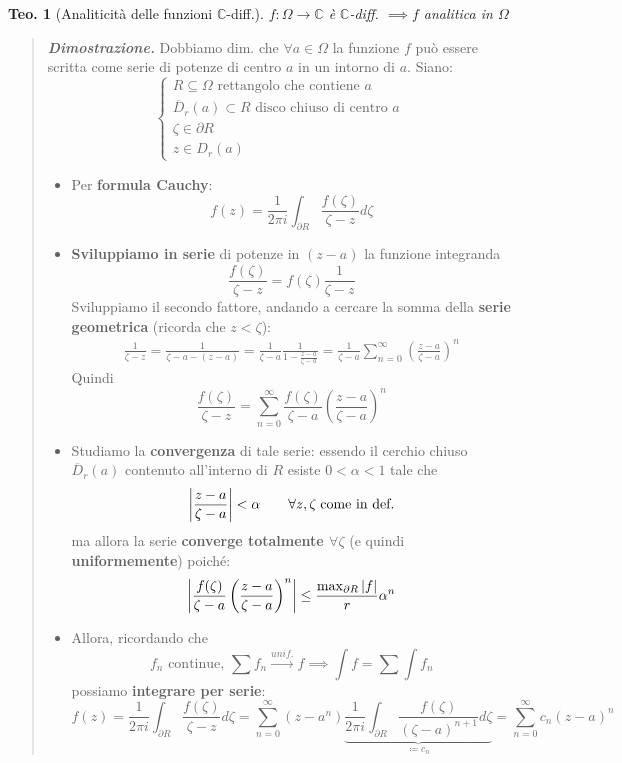 \documentclass[a4paper,10pt]{article}
\newcommand{\im}{\mathbb{C}} %
\theoremstyle{indentdefinition}
\theoremstyle{indenttheorem}
\newtheorem{thm}{Teo.}
\theoremstyle{myremark}
\theoremstyle{indentgeneral}
\newenvironment{dimo}{\begin{quote}\textit{\textbf{Dimostrazione.}}}{\end{quote}} %
\begin{document}
\begin{thm}[Analiticità delle funzioni $\im$-diff.] 
    $f:\Omega\to\im$ è $\im$-diff. $\implies f$ analitica in $\Omega$
\end{thm}

\begin{dimo}
    Dobbiamo dim. che $\forall a\in\Omega$ la funzione $f$ può essere scritta come serie di potenze di centro $a$ in un intorno di $a$. Siano:
    $$
    \begin{cases}
        R\subseteq\Omega \text{ rettangolo che contiene $a$} \\
        \overline{D}_r(a)\subset R \text{ disco chiuso di centro $a$} \\
        \zeta \in \partial R \\
        z\in D_r(a) 
    \end{cases}
    $$
    \begin{itemize}
        \item Per \textbf{formula Cauchy}:
        $$f(z)=\frac{1}{2\pi i}\int_{\partial R}\frac{f(\zeta)}{\zeta-z}d\zeta$$
        \item \textbf{Sviluppiamo in serie} di potenze in $(z-a)$ la funzione integranda 
        $$\frac{f(\zeta)}{\zeta-z}=f(\zeta)\frac{1}{\zeta-z}$$
        Sviluppiamo il secondo fattore, andando a cercare la somma della \textbf{serie geometrica} (ricorda che $z<\zeta$):
        \begin{align*}
            \frac{1}{\zeta-z}=\frac{1}{\zeta-a-(z-a)}=\frac{1}{\zeta-a}\frac{1}{1-\frac{z-a}{\zeta-a}}=\frac{1}{\zeta-a}\sum_{n=0}^\infty\left(\frac{z-a}{\zeta-a}\right)^n
        \end{align*}
        Quindi
        $$\frac{f(\zeta)}{\zeta-z}=\sum_{n=0}^\infty\frac{f(\zeta)}{\zeta-a}\left(\frac{z-a}{\zeta-a}\right)^n$$
       
        \item Studiamo la \textbf{convergenza}  di tale serie: essendo il cerchio chiuso $ \overline{D}_r(a)$ contenuto all'interno di $R$ esiste $0<\alpha<1$ tale che
        $$\abs{\frac{z-a}{\zeta-a}}<\alpha \quad \quad \forall z,\zeta\; \text{come in def.}$$
        ma allora la serie \textbf{converge totalmente \underline{$\forall\zeta$}} (e quindi \textbf{uniformemente})  poiché:
        $$\abs{\frac{f(\zeta)}{\zeta-a}\left(\frac{z-a}{\zeta-a}\right)^n}\le \frac{\max_{\partial R}\abs{f}}{r}\alpha^n$$
        
        \item Allora, ricordando che
        $$f_n \text{ continue, }\sum f_n\overset{unif.}{\longrightarrow}f \implies \int f=\sum \int f_n$$
        possiamo \textbf{integrare per serie}:
        $$f(z)=\frac{1}{2\pi i}\int_{\partial R}\frac{f(\zeta)}{\zeta-z}d\zeta=\sum_{n=0}^\infty (z-a^n)\underbrace{\frac{1}{2\pi i}\int_{\partial R}\frac{f(\zeta)}{(\zeta-a)^{n+1}}d\zeta}_{\coloneqq c_n}=\sum_{n=0}^\infty c_n(z-a)^n$$
    \end{itemize}
\end{dimo}
\end{document}
